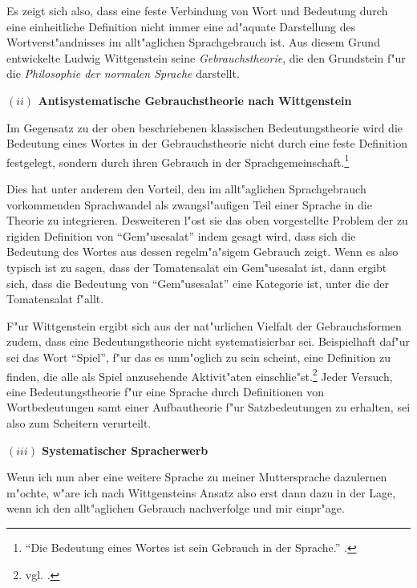 \documentclass[a4paper, emulatestandardclasses, 12pt]{scrartcl}
\begin{document}
\begin{onehalfspace}
Es zeigt sich also, dass eine feste Verbindung von Wort und Bedeutung durch eine einheitliche Definition nicht immer eine ad"aquate Darstellung des Wortverst"andnisses im allt"aglichen Sprachgebrauch ist. Aus diesem Grund entwickelte Ludwig Wittgenstein seine \emph{Gebrauchstheorie}, die den Grundstein f"ur die \emph{Philosophie der normalen Sprache} darstellt.

\vspace{5mm}
\noindent\textbf{$(ii)$ Antisystematische Gebrauchstheorie nach Wittgenstein}	

\noindent Im Gegensatz zu der oben beschriebenen klassischen Bedeutungstheorie wird die Bedeutung eines Wortes in der Gebrauchstheorie nicht durch eine feste Definition festgelegt, sondern durch ihren Gebrauch in der Sprachgemeinschaft.\footnote{"`Die Bedeutung eines Wortes ist sein Gebrauch in der Sprache."' \citep[PU \S 43]{wittgenstein1963tractatus}.}

Dies hat unter anderem den Vorteil, den im allt"aglichen Sprachgebrauch vorkommenden Sprachwandel als zwangsl"aufigen Teil einer Sprache in die Theorie zu integrieren. Desweiteren l"ost sie das oben vorgestellte Problem der zu rigiden Definition von "`Gem"usesalat"' indem gesagt wird, dass sich die Bedeutung des Wortes aus dessen regelm"a"sigem Gebrauch zeigt. Wenn es also typisch ist zu sagen, dass der Tomatensalat ein Gem"usesalat ist, dann ergibt sich, dass die Bedeutung von "`Gem"usesalat"' eine Kategorie ist, unter die der Tomatensalat f"allt. 

F"ur Wittgenstein ergibt sich aus der nat"urlichen Vielfalt der Gebrauchsformen zudem, dass eine Bedeutungstheorie nicht systematisierbar sei. Beispielhaft daf"ur sei das Wort "`Spiel"', f"ur das es unm"oglich zu sein scheint, eine Definition zu finden, die alle als Spiel anzusehende Aktivit"aten einschlie"st.\footnote{vgl. \cite[PU \S 66]{wittgenstein1963tractatus}.} Jeder Versuch, eine Bedeutungstheorie f"ur eine Sprache durch Definitionen von Wortbedeutungen samt einer Aufbautheorie f"ur Satzbedeutungen zu erhalten, sei also zum Scheitern verurteilt. 


\vspace{5mm}
\noindent\textbf{$(iii)$ Systematischer Spracherwerb}	

\noindent Wenn ich nun aber eine weitere Sprache zu meiner Muttersprache dazulernen m"ochte, w"are ich nach Wittgensteins Ansatz also erst dann dazu in der Lage, wenn ich den allt"aglichen Gebrauch nachverfolge und mir einpr"age. 


\end{onehalfspace}
\end{document}
